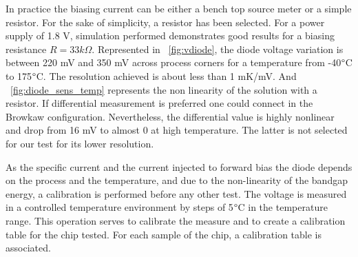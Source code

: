 In practice the biasing current can be either a bench top source meter or a simple resistor. For the sake of simplicity, a resistor has been selected. For a power supply of 1.8 V, simulation performed demonstrates good results for a biasing resistance $R = 33 k\Omega$. Represented in \figurename~\ref{fig:vdiode}, the diode voltage variation is between 220 mV and 350 mV across process corners for a temperature from -40\(\degree\)C to 175\(\degree\)C. The resolution achieved is about less than 1 mK/mV. And \figurename~\ref{fig:diode_sens_temp} represents the non linearity of the solution with a resistor. If differential measurement is preferred one could connect in the Browkaw configuration. Nevertheless, the differential value is highly nonlinear and drop from 16 mV to almost 0 at high temperature. The latter is not selected for our test for its lower resolution.

As the specific current and the current injected to forward bias the diode depends on the process and the temperature, and due to the non-linearity of the bandgap energy, a calibration is performed before any other test. The voltage is measured in a controlled temperature environment by steps of 5\(\degree\)C in the temperature range. This operation serves to calibrate the measure and to create a calibration table for the chip tested. For each sample of the chip, a calibration table is associated.

